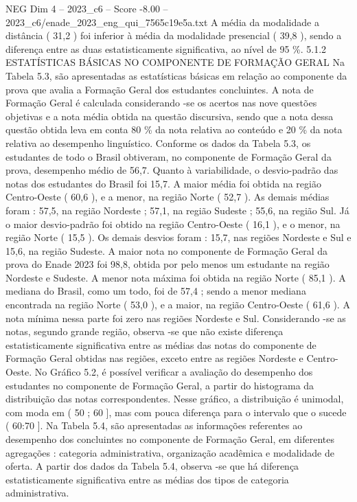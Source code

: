 \begin{textsample}{NEG Dim 4 – 2023\_c6 – Score -8.00 – 2023\_c6/enade\_2023\_eng\_qui\_7565c19e5a.txt}
A média da modalidade a distância ( 31,2 ) foi inferior à média da modalidade presencial ( 39,8 ), sendo a diferença entre as duas estatisticamente significativa, ao nível de 95 \%. 5.1.2 ESTATÍSTICAS BÁSICAS NO COMPONENTE DE FORMAÇÃO GERAL Na Tabela 5.3, são apresentadas as estatísticas básicas em relação ao componente da prova que avalia a Formação Geral dos estudantes concluintes.
A nota de Formação Geral é calculada considerando -se os acertos nas nove questões objetivas e a nota média obtida na questão discursiva, sendo que a nota dessa questão obtida leva em conta 80 \% da nota relativa ao conteúdo e 20 \% da nota relativa ao desempenho linguístico.
Conforme os dados da Tabela 5.3, os estudantes de todo o Brasil obtiveram, no componente de Formação Geral da prova, desempenho médio de 56,7.
Quanto à variabilidade, o desvio-padrão das notas dos estudantes do Brasil foi 15,7.
A maior média foi obtida na região Centro-Oeste ( 60,6 ), e a menor, na região Norte ( 52,7 ).
As demais médias foram : 57,5, na região Nordeste ; 57,1, na região Sudeste ; 55,6, na região Sul.
Já o maior desvio-padrão foi obtido na região Centro-Oeste ( 16,1 ), e o menor, na região Norte ( 15,5 ).
Os demais desvios foram : 15,7, nas regiões Nordeste e Sul e 15,6, na região Sudeste.
A maior nota no componente de Formação Geral da prova do Enade 2023 foi 98,8, obtida por pelo menos um estudante na região Nordeste e Sudeste.
A menor nota máxima foi obtida na região Norte ( 85,1 ).
A mediana do Brasil, como um todo, foi de 57,4 ; sendo a menor mediana encontrada na região Norte ( 53,0 ), e a maior, na região Centro-Oeste ( 61,6 ).
A nota mínima nessa parte foi zero nas regiões Nordeste e Sul.
Considerando -se as notas, segundo grande região, observa -se que não existe diferença estatisticamente significativa entre as médias das notas do componente de Formação Geral obtidas nas regiões, exceto entre as regiões Nordeste e Centro-Oeste.
No Gráfico 5.2, é possível verificar a avaliação do desempenho dos estudantes no componente de Formação Geral, a partir do histograma da distribuição das notas correspondentes.
Nesse gráfico, a distribuição é unimodal, com moda em ( 50 ; 60 ], mas com pouca diferença para o intervalo que o sucede ( 60:70 ].
Na Tabela 5.4, são apresentadas as informações referentes ao desempenho dos concluintes no componente de Formação Geral, em diferentes agregações : categoria administrativa, organização acadêmica e modalidade de oferta.
A partir dos dados da Tabela 5.4, observa -se que há diferença estatisticamente significativa entre as médias dos tipos de categoria administrativa.

\end{textsample}

